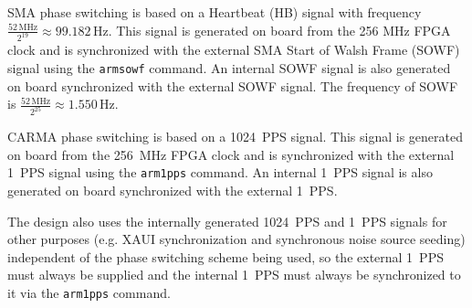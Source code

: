 \documentclass[12pt]{article}
\begin{document}
SMA phase switching is based on a Heartbeat (HB) signal with frequency
$\frac{52 \, \mathrm{MHz}}{2^{19}} \approx 99.182 \, \mathrm{Hz}$.  This signal
is generated on board from the 256 MHz FPGA clock and is synchronized with the
external SMA Start of Walsh Frame (SOWF) signal using the \verb|armsowf|
command.  An internal SOWF signal is also generated on board synchronized with
the external SOWF signal.  The frequency of SOWF is $\frac{52 \,
\mathrm{MHz}}{2^{25}} \approx 1.550 \, \mathrm{Hz}$.

CARMA phase switching is based on a 1024~PPS signal.  This signal is generated
on board from the 256~MHz FPGA clock and is synchronized with the external
1~PPS signal using the \verb|arm1pps| command.  An internal 1~PPS signal is
also generated on board synchronized with the external 1~PPS.

The design also uses the internally generated 1024~PPS and 1~PPS signals for
other purposes (e.g. XAUI synchronization and synchronous noise source seeding)
independent of the phase switching scheme being used, so the external 1~PPS
must always be supplied and the internal 1~PPS must always be synchronized to
it via the \verb|arm1pps| command.
\end{document}
